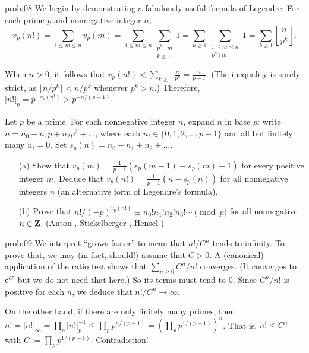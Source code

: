 \begin{sol}{prob:08} We begin by demonstrating a fabulously useful formula of Legendre: For each prime $p$ and nonnegative integer $n$,
\[ v_p(n!) = \sum_{1 \le m \le n} v_p(m) = \sum_{1 \le m \le n} \sum_{\substack{p^k \mid m \\ k \ge 1}} 1 = \sum_{k \ge 1} \sum_{\substack{1 \le m \le n \\ p^k \mid m}} 1 = \sum_{k \ge 1} \left\lfloor \frac{n}{p^k}\right\rfloor. \]

When $n>0$, it follows that $v_p(n!) < \sum_{k \ge 1} \frac{n}{p^k} = \frac{n}{p-1}$. (The inequality is surely strict, as $\lfloor n/p^k\rfloor < n/p^k$ whenever $p^k > n$.) Therefore, $|n!|_{p} = p^{-v_p(n!)} > p^{-n/(p-1)}$.
\end{sol}

\begin{challenge} Let $p$ be a prime. For each nonnegative integer $n$, expand $n$ in base $p$: write $n = n_0 + n_1 p + n_2 p^2 + \dots$, where each $n_i \in \{0,1,2,\dots,p-1\}$ and all but finitely many $n_i=0$. Set $s_p(n) = n_0 + n_1 + n_2 + \dots$.
\begin{enumerate} 
\item[(a)] Show that $v_p(m) = \frac{1}{p-1}(s_p(m-1)-s_p(m)+1)$ for every positive integer $m$. Deduce that $v_p(n!) = \frac{1}{p-1}(n - s_p(n))$ for all nonnegative integers $n$ (an alternative form of Legendre's formula).
\item[(b)] Prove that $n!/(-p)^{v_p(n!)} \equiv n_0! n_1! n_2! n_3! \cdots\pmod{p}$ for all nonnegative $n\in\mathbf{Z}$. (Anton \cite{anton}, Stickelberger \cite[pp.~342--343]{stickelberger}, Hensel \cite{hensel})
\end{enumerate}
\end{challenge}


\begin{sol}{prob:09} We interpret ``grows faster'' to mean that $n!/C^{n}$ tends to infinity. To prove that, we may (in fact, should!) assume that $C>0$. A (canonical) application of the ratio test shows that $\sum_{n\ge 0} C^n/n!$ converges. (It converges to $\mathrm{e}^C$ but we do not need that here.) So its terms must tend to $0$. Since $C^n/n!$ is positive for each $n$, we deduce that $n!/C^n\to\infty$.

On the other hand, if there are only finitely many primes, then $n! = |n!|_{\infty} = \prod_{p} |n!|_{p}^{-1} \le \prod_{p} p^{n/(p-1)} = (\prod_{p} p^{1/(p-1)})^{n}$. That is, $n! \le C^n$ with $C := \prod_{p} p^{1/(p-1)}$. Contradiction!
\end{sol}


